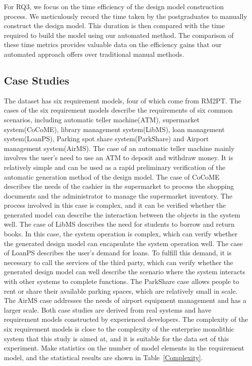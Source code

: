 \documentclass[pdflatex,sn-mathphys-num]{sn-jnl}%
\theoremstyle{thmstyleone}%
\theoremstyle{thmstyletwo}%
\theoremstyle{thmstylethree}%
\begin{document}
For RQ3, we focus on the time efficiency of the design model construction process. We meticulously record the time taken by the postgraduates to manually construct the design model. This duration is then compared with the time required to build the model using our automated method. The comparison of these time metrics provides valuable data on the efficiency gains that our automated approach offers over traditional manual methods.
\subsection{Case Studies}
The dataset has six requirement models, four of which come from RM2PT. The cases of the six requirement models describe the requirements of six common scenarios, including automatic teller machine(ATM), supermarket system(CoCoME), library management system(LibMS), loan management system(LoanPS), Parking spot share system(ParkShare) and  Airport management system(AirMS). The case of an automatic teller machine mainly involves the user's need to use an ATM to deposit and withdraw money. It is relatively simple and can be used as a rapid preliminary verification of the automatic generation method of the design model. The case of CoCoME describes the needs of the cashier in the supermarket to process the shopping documents and the administrator to manage the supermarket inventory. The process involved in this case is complex, and it can be verified whether the generated model can describe the interaction between the objects in the system well. The case of LibMS describes the need for students to borrow and return books. In this case, the system operation is complex, which can verify whether the generated design model can encapsulate the system operation well. The case of LoanPS describes the user's demand for loans. To fulfill this demand, it is necessary to call the services of the third party, which can verify whether the generated design model can well describe the scenario where the system interacts with other systems to complete functions. The ParkShare case allows people to rent or share their available parking spaces, which are relatively small in scale. The AirMS case addresses the needs of airport equipment management and has a larger scale. Both case studies are derived from real systems and have requirement models constructed by experienced developers. The complexity of the six requirement models is close to the complexity of the enterprise monolithic system that this study is aimed at, and it is suitable for the data set of this experiment. Make statistics on the number of model elements in the requirement model, and the statistical results are shown in Table~\ref{Complexity}.
\end{document}
